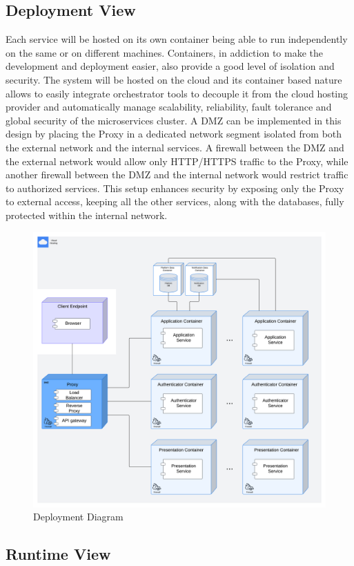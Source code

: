 \subsection{Deployment View}
Each service will be hosted on its own container being able to run independently on the same or on different machines. Containers, in addiction to make the development and deployment easier, also provide a good level of isolation and security.
The system will be hosted on the cloud and its container based nature allows to easily integrate orchestrator tools to decouple it from the cloud hosting provider and automatically manage scalability, reliability, fault tolerance and global security of the microservices cluster.
A DMZ can be implemented in this design by placing the Proxy in a dedicated network segment isolated from both the external network and the internal services. A firewall between the DMZ and the external network would allow only HTTP/HTTPS traffic to the Proxy, while another firewall between the DMZ and the internal network would restrict traffic to authorized services. This setup enhances security by exposing only the Proxy to external access, keeping all the other services, along with the databases, fully protected within the internal network.
\begin{figure}[H]
    \centering
    \includegraphics[width=0.8\linewidth]{Latex/Images/DD/Deployment.png}
    \caption{Deployment Diagram}
    \label{fig:Deployment}
\end{figure}
\subsection{Runtime View}
